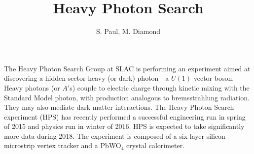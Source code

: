 \documentclass[b1]{sciposter}
\title{Heavy Photon Search}
\author{S. Paul, M. Diamond}
\institute{College of William and Mary, SLAC National Accelerator Laboratory}
\begin{document}
\maketitle

{The Heavy Photon Search Group at SLAC is performing an experiment aimed at discovering a hidden-sector heavy (or dark) photon - a $U(1)$ vector boson. Heavy photons (or $A'$s) couple to electric charge through kinetic mixing with the Standard Model photon, with production analogous to bremsstrahlung radiation. They may also mediate dark matter interactions. The Heavy Photon Search experiment (HPS) has recently performed a successful engineering run in spring of 2015 and physics run in winter of 2016. HPS is expected to take significantly more data during 2018. The experiment is composed of a six-layer silicon microstrip vertex tracker and a PbWO$_4$ crystal calorimeter. 
}
\end{document}
